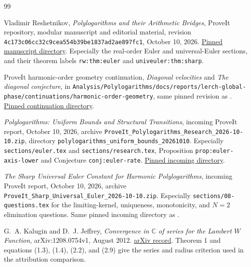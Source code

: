 \clearpage
\begin{thebibliography}{99}

Vladimir Reshetnikov, \emph{Polylogarithms and their Arithmetic Bridges},
ProveIt repository, modular manuscript and editorial material,
revision \texttt{4c173c06cc32c9cea554b39be1837ad2ae897fc1},
October 10, 2026.
\href{https://github.com/VladimirReshetnikov/ProveIt/tree/4c173c06cc32c9cea554b39be1837ad2ae897fc1/Analysis/Polylogarithms/docs/manuscript}{Pinned manuscript directory}.
Especially the real-order Euler and universal-Euler sections, and their
theorem labels \texttt{rw:thm:euler} and
\texttt{univeuler:thm:sharp}.

ProveIt harmonic-order geometry continuation,
\emph{Diagonal velocities} and \emph{The diagonal conjecture},
in
\nolinkurl{Analysis/Polylogarithms/docs/reports/lerch-global-phase/continuations/harmonic-order-geometry},
same pinned revision as \cite{ProveItSnapshot}.
\href{https://github.com/VladimirReshetnikov/ProveIt/tree/4c173c06cc32c9cea554b39be1837ad2ae897fc1/Analysis/Polylogarithms/docs/reports/lerch-global-phase/continuations/harmonic-order-geometry}{Pinned continuation directory}.

\emph{Polylogarithms: Uniform Bounds and Structural Transitions},
incoming ProveIt report, October 10, 2026, archive
\nolinkurl{ProveIt_Polylogarithms_Research_2026-10-10.zip},
directory \nolinkurl{polylogarithms_uniform_bounds_20261010}.
Especially \nolinkurl{sections/euler.tex} and
\nolinkurl{sections/research.tex}, Proposition
\texttt{prop:euler-axis-lower} and Conjecture
\texttt{conj:euler-rate}.
\href{https://github.com/VladimirReshetnikov/ProveIt/tree/4c173c06cc32c9cea554b39be1837ad2ae897fc1/docs/incoming}{Pinned incoming directory}.

\emph{The Sharp Universal Euler Constant for Harmonic Polylogarithms},
incoming ProveIt report, October 10, 2026, archive
\nolinkurl{ProveIt_Sharp_Universal_Euler_2026-10-10.zip}.
Especially \nolinkurl{sections/08-questions.tex} for the limiting-kernel,
uniqueness, monotonicity, and $N=2$ elimination questions.
Same pinned incoming directory as \cite{UniformBoundsIncoming}.

G.~A. Kalugin and D.~J. Jeffrey,
\emph{Convergence in $\mathbb C$ of series for the Lambert $W$ Function},
arXiv:1208.0754v1, August 2012.
\href{https://arxiv.org/abs/1208.0754}{arXiv record}.
Theorem 1 and equations (1.3), (1.4), (2.2), and (2.9) give the
series and radius criterion used in the attribution comparison.


\end{thebibliography}
